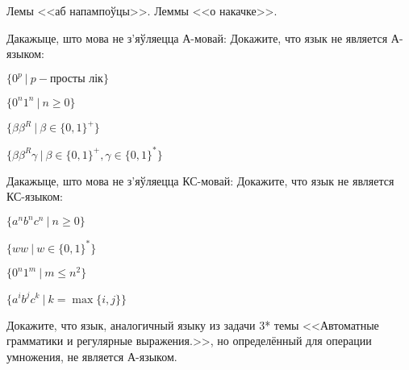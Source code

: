 \documentclass[12pt, a4paper]{article}
\begin{document}
\biLangHeader
{Лемы <<аб напампоўцы>>.}
{Леммы <<о накачке>>.}

\begin{problemList}

\problemItemWithCommonPart
{Дакажыце, што мова не з'яўляецца А-мовай:}
{Докажите, что язык не является А-языком:}
{%
\begin{belarusianEnumerateTwocol}
    \item $\{0^p\ |\ p - \text{просты лік}\}$
    \item $\{0^n1^n\ |\ n\ge 0\}$
    \item $\{\beta\beta^R\ |\ \beta\in\{0, 1\}^+\}$
    \item $\{\beta\beta^R\gamma\ |\ \beta\in\{0, 1\}^+, \gamma\in\{0, 1\}^*\}$
\end{belarusianEnumerateTwocol}
}

\problemItemWithCommonPart
{Дакажыце, што мова не з'яўляецца КС-мовай:}
{Докажите, что язык не является КС-языком:}
{%
\begin{belarusianEnumerateTwocol}
    \item $\{a^nb^nc^n\ |\ n\ge 0\}$
    \item $\{ww\ |\ w\in\{0, 1\}^*\}$
    \item $\{0^n1^m\ |\ m\le n^2\}$
    \item $\{a^ib^jc^k\ |\ k=\max\{i, j\}\}$
\end{belarusianEnumerateTwocol}
}

{Докажите, что язык, аналогичный языку из задачи 3* темы <<Автоматные грамматики и регулярные выражения.>>, но определённый для операции умножения, не является А-языком.}

\end{problemList}
\end{document}
